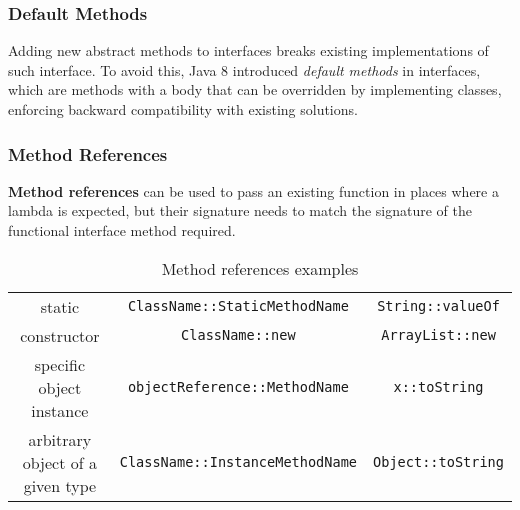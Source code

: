 \subsubsection{Default Methods}
Adding new abstract methods to interfaces breaks existing implementations of such interface.
To avoid this, Java 8 introduced \textit{default methods} in interfaces, which are methods with a body that can be overridden by implementing classes,
enforcing backward compatibility with existing solutions.

\subsubsection{Method References}
\textbf{Method references} can be used to pass an existing
function in places where a lambda is expected,
but their signature needs to
match the signature of the functional interface method required.
\begin{table}[htbp]
   \centering
   \begin{tabular}{|c|c|c|}
      \hline
      static  & \lstinline|ClassName::StaticMethodName| & \lstinline|String::valueOf|\\
      constructor &  \lstinline|ClassName::new| & \lstinline|ArrayList::new|\\
      specific object instance & \lstinline|objectReference::MethodName| & \lstinline|x::toString|\\
      arbitrary object of a given type & \lstinline|ClassName::InstanceMethodName| & \lstinline|Object::toString|\\
      \hline
   \end{tabular}
   \caption{Method references examples}
   \label{tab:method_references}
\end{table}